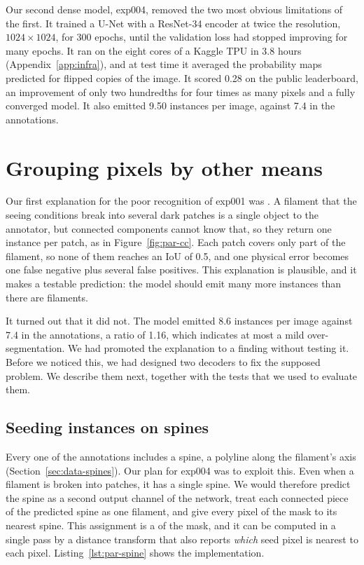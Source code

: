 Our second dense model, exp004, removed the two most obvious limitations of the first. It trained a
U-Net with a ResNet-34 encoder at twice the resolution, $1024\times1024$, for 300 epochs, until the
validation loss had stopped improving for many epochs. It ran on the eight cores of a Kaggle TPU in
3.8 hours (Appendix~\ref{app:infra}), and at test time it averaged the probability maps predicted
for flipped copies of the image. It scored 0.28 on the public leaderboard, an improvement of only
two hundredths for four times as many pixels and a fully converged model. It also emitted 9.50
instances per image, against 7.4 in the annotations.

\section{Grouping pixels by other means}\label{sec:paradigms-fragments}
Our first explanation for the poor recognition of exp001 was . A filament
that the seeing conditions break into several dark patches is a single object to the annotator, but
connected components cannot know that, so they return one instance per patch, as in
Figure~\ref{fig:par-cc}. Each patch covers only part of the filament, so none of them reaches an IoU
of 0.5, and one physical error becomes one false negative plus several false positives. This
explanation is plausible, and it makes a testable prediction: the model should emit many more
instances than there are filaments.

It turned out that it did not. The model emitted 8.6 instances per image against 7.4 in the
annotations, a ratio of 1.16, which indicates at most a mild over-segmentation.
 We had promoted the explanation to a finding without testing it. Before we noticed
this, we had designed two decoders to fix the supposed problem. We describe them next, together
with the tests that we used to evaluate them.

\subsection{Seeding instances on spines}\label{sec:par-spine}
Every one of the \AllFilaments{} annotations includes a spine, a polyline along the filament's axis
(Section~\ref{sec:data-spines}). Our plan for exp004 was to exploit this. Even when a filament is
broken into patches, it has a single spine. We would therefore predict the spine as a second output
channel of the network, treat each connected piece of the predicted spine as one filament, and give
every pixel of the mask to its nearest spine. This assignment is a  of
the mask, and it can be computed in a single pass by a distance transform that also reports
\emph{which} seed pixel is nearest to each pixel. Listing~\ref{lst:par-spine} shows the
implementation.

